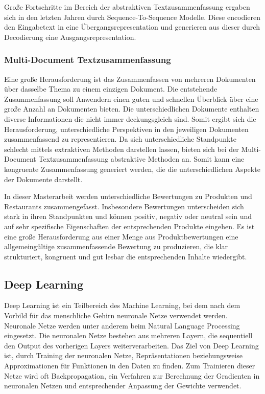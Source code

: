 Große Fortschritte im Bereich der abstraktiven Textzusammenfassung ergaben sich in den letzten Jahren durch Sequence-To-Sequence Modelle. Diese encodieren den Eingabetext in eine Übergangsrepresentation und generieren aus dieser durch Decodierung eine Ausgangsrepresentation.

\subsubsection{Multi-Document Textzusammenfassung}
Eine große Herausforderung ist das Zusammenfassen von mehreren Dokumenten über dasselbe Thema zu einem einzigen Dokument. 
Die entstehende Zusammenfassung soll Anwendern einen guten und schnellen Überblick über eine große Anzahl an Dokumenten bieten. 
Die unterschiedlichen Dokumente enthalten diverse Informationen die nicht immer deckungsgleich sind. 
Somit ergibt sich die Herausforderung, unterschiedliche Perspektiven in den jeweiligen Dokumenten zusammenfassend zu representieren.
Da sich unterschiedliche Standpunkte schlecht mittels extraktiven Methoden darstellen lassen, bieten sich bei der Multi-Document Textzusammenfassung abstraktive Methoden an.
Somit kann eine kongruente Zusammenfassung generiert werden, die die unterschiedlichen Aspekte der Dokumente darstellt.

In dieser Masterarbeit werden unterschiedliche Bewertungen zu Produkten und Restaurants zusammengefasst. 
Insbesondere Bewertungen unterscheiden sich stark in ihren Standpunkten und können positiv, negativ oder neutral sein und auf sehr spezifische Eigenschaften der entsprechenden Produkte eingehen.
Es ist eine große Herausforderung aus einer Menge aus Produktbewertungen eine allgemeingültige zusammenfassende Bewertung zu produzieren, die klar strukturiert, kongruent und gut lesbar die entsprechenden Inhalte wiedergibt.

\subsection{Deep Learning}
Deep Learning ist ein Teilbereich des Machine Learning, bei dem nach dem Vorbild für das menschliche Gehirn neuronale Netze verwendet werden. 
Neuronale Netze werden unter anderem beim Natural Language Processing eingesetzt. 
Die neuronalen Netze bestehen aus mehreren Layern, die sequentiell den Output des vorherigen Layers weiterverarbeiten. 
Das Ziel von Deep Learning ist, durch Training der neuronalen Netze, Repräsentationen beziehungsweise Approximationen für Funktionen in den Daten zu finden.
Zum Trainieren dieser Netze wird oft Backpropagation, ein Verfahren zur Berechnung der Gradienten in neuronalen Netzen und entsprechender Anpassung der Gewichte verwendet.

